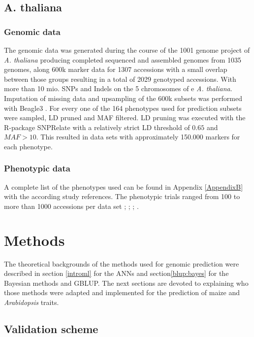 \subsection{A. thaliana}

\subsubsection{Genomic data}

The genomic data was generated during the course of the 1001 genome project of \textit{A. thaliana}
\cite{1001genome} producing completed sequenced and assembled genomes from 1035 genomes, along 600k marker
data for 1307 accessions with a small overlap between those groups resulting in a total of 2029 genotyped
accessions. With more than 10 mio. SNPs and Indels on the 5 chromosomes of e \textit{A. thaliana}. Imputation
of missing data and upsampling of the 600k subsets was performed with Beagle3 \cite{browning2007rapid}. For
every one of the 164 phenotypes used for prediction subsets were sampled, LD pruned and MAF filtered. LD
pruning was executed with the R-package SNPRelate \cite{zheng2013tutorial} with a relatively strict LD
threshold of $0.65$ and $MAF > 10 $. This resulted in data sets with approximately 150.000 markers for each
phenotype.

\subsubsection{Phenotypic data}
A complete list of the phenotypes used can be found in Appendix \ref{AppendixB} with the according study
references. The phenotypic trials ranged from 100 to more than 1000 accessions per data set \cite{atwell2010}; \cite{li2010}; \cite{strauch2015}; \cite{me2014}.


\section{Methods}

The theoretical backgrounds of the methods used for genomic prediction were described in section \ref{introml}
for the ANNs and section\ref{blup:bayes} for the Bayesian methods and GBLUP. The next sections are devoted to
explaining who those methods were adapted and implemented for the prediction of maize and \textit{Arabidopsis}
traits.

\subsection{Validation scheme} \label{cv}

